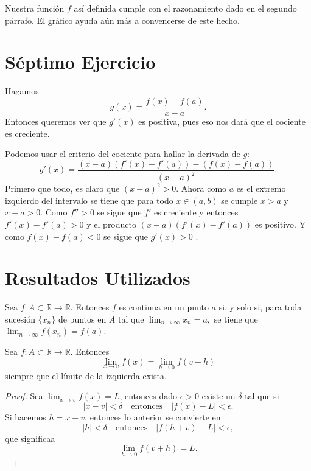 \documentclass[fleqn,leqno,12pt,letterpaper,final]{article}
\begin{document}
Nuestra función $f$ así definida cumple con el razonamiento dado
en el segundo párrafo. El gráfico ayuda aún más a convencerse de este hecho.

\section{Séptimo Ejercicio}%
Hagamos
\[
	g(x)= \frac{f(x)-f(a)}{x-a} .
\]
Entonces queremos ver que $g'(x)$ es positiva, pues eso nos dará que
el cociente es creciente.

Podemos usar el criterio del cociente para hallar la derivada de $g$:
\[
	g'(x)= \frac{(x-a)(f'(x)-f'(a))-(f(x)-f(a))}{(x-a)^2} .
\]
Primero que todo, es claro que $(x-a)^2>0$. Ahora como $a$ es el extremo izquierdo del intervalo se tiene
que para todo $x\in(a,b)$ se cumple $x>a$ y $x-a>0$. Como $f''>0$ se sigue que $f'$ es creciente y entonces
$f'(x)-f'(a)>0$ y el producto $(x-a)(f'(x)-f'(a))$ es positivo. Y como $f(x)-f(a)<0$ se sigue que $g'(x)>0$
.

\section{Resultados Utilizados}

\begin{cor}\label{cor:contseq}
	Sea $f\colon A\subset\mathbb{R}\to\mathbb{R}$. Entonces $f$ es continua en un punto $a$ si, y solo si,
	para toda sucesión $\{ x_n \}$ de puntos en $A$ tal que  
	$ \lim_{n \to \infty}x_n=a, $
	se tiene que $ \lim_{n \to \infty} f(x_n)=f(a)$.
\end{cor}
\begin{teo}\label{teo:limcambvar}
	Sea $f\colon A\subset\mathbb{R}\to\mathbb{R}$. Entonces
	\[
		\lim_{x\to v} f(x)= \lim_{h\to 0} f(v+h)
	\]
	siempre que el límite de la izquierda exista.
\end{teo}
\begin{proof}
	Sea $ \lim_{x\to v} f(x)=L$, entonces dado $\epsilon>0$ existe un $\delta$ tal que si
	\[
		\left\lvert x-v \right\rvert<\delta\quad\text{entonces}\quad
		\left\lvert f(x)-L \right\rvert<\epsilon.
	\]
	Si hacemos $h=x-v$, entonces lo anterior se convierte en
	\[
		\left\lvert h \right\rvert<\delta\quad\text{entonces}\quad
		\left\lvert f(h+v)-L \right\rvert<\epsilon,
	\]
	que significaa
	\[
	\lim_{h\to 0} f(v+h)=L.
	\]
\end{proof}
\end{document}
